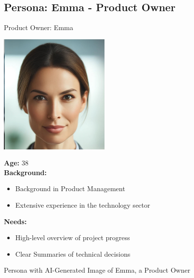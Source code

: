 \pagebreak

\begin{figure}[h!]
\subsection*{Persona: Emma - Product Owner}
\begin{persona}{Product Owner: Emma}
\begin{tcbraster}[raster columns=2, raster column skip=5mm]
  \begin{tcolorbox}[width=0.2\linewidth, colback=white, colframe=white, boxrule=0pt, halign=center]
    \includegraphics[width=\linewidth, height=6cm, keepaspectratio]{Images/Emma.jpg}
  \end{tcolorbox}
  \begin{tcolorbox}[width=0.8\linewidth, colback=white, colframe=white, boxrule=0pt]
  \fontsize{10pt}{9.6pt}\selectfont
    \textbf{Age:} 38\\
    \textbf{Background:} 
    \begin{itemize}
        \item Background in Product Management
        \item Extensive experience in the technology sector
    \end{itemize}
    \textbf{Needs:}
        \begin{itemize}
        \item High-level overview of project progress
        \item Clear Summaries of technical decisions
    \end{itemize}
  \end{tcolorbox}
\end{tcbraster}
\end{persona}
\caption{Persona with \ac{AI}-Generated Image of Emma, a Product Owner}
\label{fig:persona:emma}
\end{figure}




